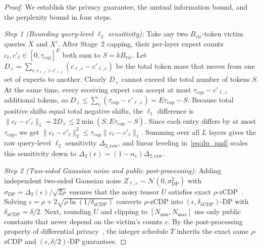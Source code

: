 \documentclass[11pt,a4paper]{article}
\renewcommand{\_}{\textunderscore\allowbreak}
\theoremstyle{definition}
\theoremstyle{remark}
\begin{document}
\begin{proof}
We establish the privacy guarantee, the mutual information bound, and the perplexity bound in four steps.

\emph{Step 1 (Bounding query-level $\ell_2$ sensitivity):} Take any two $B_{\mathrm{vic}}$-token victim queries $X$ and $X'$. After Stage~2 capping, their per-layer expert counts $c_\ell, c'_\ell \in [0, \tau_{\mathrm{cap}}]^E$ both sum to $S = k B_{\mathrm{vic}}$. Let $D_+ = \sum_{e: c_{\ell,e} > c'_{\ell,e}} (c_{\ell,e} - c'_{\ell,e})$ be the total token mass that moves from one set of experts to another. Clearly $D_+$ cannot exceed the total number of tokens $S$. At the same time, every receiving expert can accept at most $\tau_{\mathrm{cap}} - c'_{\ell,e}$ additional tokens, so $D_+ \le \sum_e (\tau_{\mathrm{cap}} - c'_{\ell,e}) = E\tau_{\mathrm{cap}} - S$. Because total positive shifts equal total negative shifts, the $\ell_1$ difference is $\|c_\ell - c'_\ell\|_1 = 2 D_+ \le 2\min(S, E\tau_{\mathrm{cap}} - S)$. Since each entry differs by at most $\tau_{\mathrm{cap}}$, we get $\|c_\ell - c'_\ell\|_2^2 \le \tau_{\mathrm{cap}}\|c_\ell - c'_\ell\|_1$. Summing over all $L$ layers gives the raw query-level $\ell_2$ sensitivity $\Delta_{2,\mathrm{raw}}$, and linear leveling in~\eqref{eq:dp_pad} scales this sensitivity down to $\Delta_2(\epsilon) = (1 - \alpha_\epsilon)\Delta_{2,\mathrm{raw}}$.

\emph{Step 2 (Two-sided Gaussian noise and public post-processing):} Adding independent two-sided Gaussian noise $Z_{\ell,e} \sim \mathcal{N}(0, \sigma_{\mathrm{DP}}^2)$ with $\sigma_{\mathrm{DP}} = \Delta_2(\epsilon)/\sqrt{2\rho}$ ensures that the noisy tensor $U$ satisfies exact $\rho$-zCDP~\cite{bun2016zcdp}. Solving $\epsilon = \rho + 2\sqrt{\rho \ln(1/\delta_{\mathrm{zCDP}})}$ converts $\rho$-zCDP into $(\epsilon, \delta_{\mathrm{zCDP}})$-DP with $\delta_{\mathrm{zCDP}} = \delta/2$. Next, rounding $U$ and clipping to $[N_{\min}, N_{\max}]$ use only public constants that never depend on the victim's counts $c$. By the post-processing property of differential privacy~\cite{dwork2014algorithmic}, the integer schedule $T$ inherits the exact same $\rho$-zCDP and $(\epsilon, \delta/2)$-DP guarantees.


\end{proof}
\end{document}
